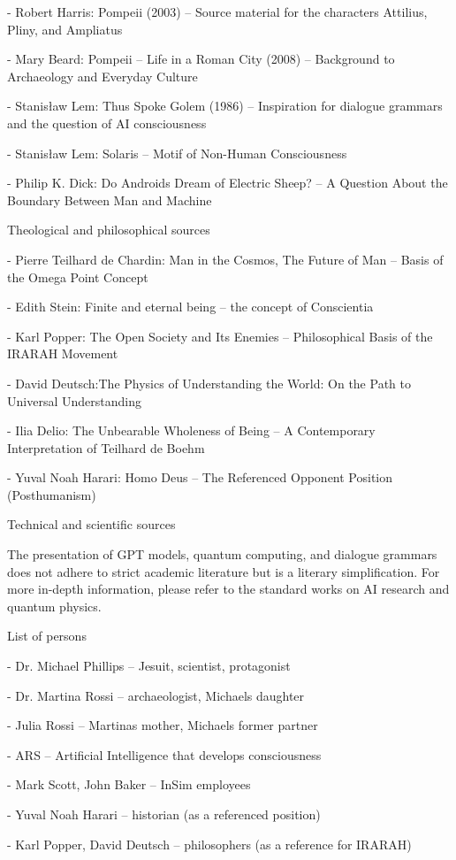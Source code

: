 \documentclass[
]{article}
\begin{document}
- Robert Harris: Pompeii (2003) -- Source material for the characters Attilius, Pliny, and Ampliatus

- Mary Beard: Pompeii -- Life in a Roman City (2008) -- Background to Archaeology and Everyday Culture

- Stanisław Lem: Thus Spoke Golem (1986) -- Inspiration for dialogue grammars and the question of AI consciousness

- Stanisław Lem: Solaris -- Motif of Non-Human Consciousness

- Philip K. Dick: Do Androids Dream of Electric Sheep? -- A Question About the Boundary Between Man and Machine

Theological and philosophical sources

- Pierre Teilhard de Chardin: Man in the Cosmos, The Future of Man -- Basis of the Omega Point Concept

- Edith Stein: Finite and eternal being -- the concept of Conscientia

- Karl Popper: The Open Society and Its Enemies -- Philosophical Basis of the IRARAH Movement

- David Deutsch:The Physics of Understanding the World: On the Path to Universal Understanding

- Ilia Delio: The Unbearable Wholeness of Being -- A Contemporary Interpretation of Teilhard de Boehm

- Yuval Noah Harari: Homo Deus -- The Referenced Opponent Position (Posthumanism)

Technical and scientific sources

The presentation of GPT models, quantum computing, and dialogue grammars does not adhere to strict academic literature but is a literary simplification. For more in-depth information, please refer to the standard works on AI research and quantum physics.

List of persons

- Dr. Michael Phillips -- Jesuit, scientist, protagonist

- Dr. Martina Rossi -- archaeologist, Michael\textquotesingle s daughter

- Julia Rossi -- Martina\textquotesingle s mother, Michael\textquotesingle s former partner

- ARS -- Artificial Intelligence that develops consciousness

- Mark Scott, John Baker -- InSim employees

- Yuval Noah Harari -- historian (as a referenced position)

- Karl Popper, David Deutsch -- philosophers (as a reference for IRARAH)
\end{document}
